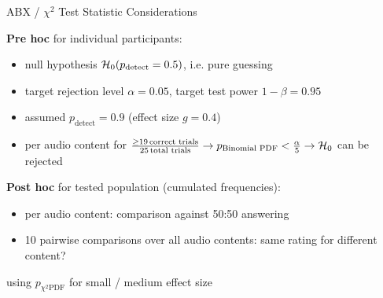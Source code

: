 \documentclass[mathserif]{intbeamer}
\begin{document}
\begin{frame}{ABX / $\chi^2$ Test Statistic Considerations}


\textbf{Pre hoc} for individual participants:
\begin{itemize}
\item
null hypothesis $\mathcal{H}_{0}(p_\text{detect}=0.5)$, i.e. pure guessing
\item
target rejection level $\alpha=0.05$,
target test power $1-\beta = 0.95$

\item
assumed $p_\text{detect}=0.9$ (effect size $g=0.4$)
\item
per \textcolor{colnonzero}{audio content}
for $\frac{\geq 19\,\text{correct trials}}{25\,\text{total trials}}
\rightarrow p_\text{Binomial PDF}<\frac{\alpha}{5} \rightarrow\mathcal{H}_{0}$
can be rejected
\end{itemize}
%
\vspace{0.25cm}

\textbf{Post hoc} for tested population (cumulated frequencies):

\begin{itemize}
\item per \textcolor{colnonzero}{audio content}: comparison against 50:50 answering
\item 10 pairwise comparisons over all \textcolor{colnonzero}{audio contents}: same rating for different content?
\end{itemize}
using $p_{\chi^2 \text{PDF}}$ for small / medium effect size
\end{frame}
%
%
%
\end{document}
